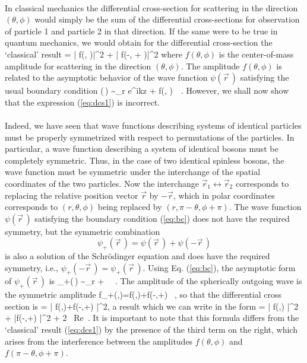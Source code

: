 \paragraph{}
In classical mechanics the differential cross-section for scattering in the direction 
$(\theta,\phi)$ would simply be the sum of the differential cross-sections for observation of 
particle 1 and particle 2 in that direction. If the same were to be true in quantum 
mechanics, we would obtain for the differential cross-section the `classical' result 
\be
{} = \left| f(\theta, \phi)\right|^2 + \left| f(\pi-\theta, \phi + \pi)\right|^2
\label{eq:dcs1}
\ee
where $f(\theta, \phi)$ is the center-of-mass amplitude for scattering in the direction $(\theta, \phi)$.
The amplitude $f(\theta,\phi)$ is related to the asymptotic behavior of the wave function $\psi(\vec{r}\,)$ satisfying the usual boundary condition
\be
\psi(\,) \sim_{r\rightarrow \infty} e^{ikz} + f(\theta, \phi)\,  \, . 
\label{eq:bc}
\ee
However, we shall now show that the expression (\ref{eq:dcs1}) is incorrect.

\paragraph{}
Indeed, we have seen that wave functions 
describing systems of identical particles must be properly symmetrized with respect to 
permutations of the particles. In particular, a wave function describing a system 
of identical bosons must be completely symmetric. Thus, in the case of two identical 
spinless bosons, the wave function must be symmetric under the interchange of the 
spatial coordinates of the two particles. Now the interchange $\vec{r}_1 \leftrightarrow \vec{r}_2$ corresponds to 
replacing the relative position vector $\vec{r}$ by $-\vec{r}$, which in polar coordinates corresponds 
to $(r, \theta, \phi)$ being replaced by $(r, \pi-\theta, \phi+\pi)$. The wave function $\psi(\vec{r}\,)$ satisfying the 
boundary condition (\ref{eq:bc}) does not have the required symmetry, but the symmetric 
combination 
\[ \psi_+(\vec{r}\,) = \psi(\vec{r}\,) + \psi(-\vec{r}\,) \]
is also a solution of the Schr\"{o}dinger equation and does have the required symmetry, i.e., 
$\psi_+(-\vec{r}\,) = \psi_+(\vec{r}\,)$. Using Eq. (\ref{eq:bc}), the asymptotic form of $\psi_+(\vec{r}\,)$ is
\be
\psi_+(\,) \sim_{r\rightarrow \infty}  +
\, \, .
\ee
The amplitude of the spherically outgoing wave is the symmetric amplitude
\be
f_+(\theta,\phi)=f(\theta,\phi)+f(\pi-\theta,\phi+\pi) \, ,
\ee
so that the differential cross section is
\be
{} = \left| f(\theta,\phi)+f(\pi-\theta,\phi+\pi) \right|^2,
\label{eq:dcs2}
\ee
a result which we can write in the form
\be
{} = \left| f(\theta,\phi) \right|^2 + \left|f(\pi-\theta,\phi+\pi) \right|^2 
+ 2 \, {\rm Re}\, .
\ee
It is important to note that this formula differs from the `classical' result (\ref{eq:dcs1}) 
by the presence of the third term on the right, which arises from the interference 
between the amplitudes $f(\theta,\phi)$ and $f(\pi-\theta,\phi+\pi)$. 


